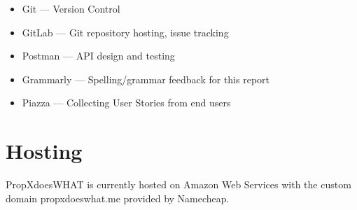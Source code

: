 \documentclass[12pt]{article}
\begin{document}
\begin{itemize}
	\item Git		--- Version Control
	\item GitLab	--- Git repository hosting, issue tracking
	\item Postman	--- API design and testing %
	\item Grammarly	--- Spelling/grammar feedback for this report
	\item Piazza	--- Collecting User Stories from end users
\end{itemize}

\section{Hosting}

PropXdoesWHAT is currently hosted on Amazon Web Services with the custom domain propxdoeswhat.me provided by Namecheap.
\end{document}
